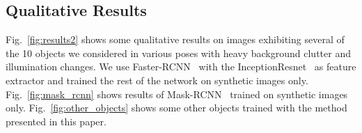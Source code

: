 \documentclass[10pt,twocolumn,letterpaper]{article}
\newcommand{\comment}[1]{}
\begin{document}

\subsection{Qualitative Results}
\label{sec:images}

Fig.~\ref{fig:results2}  shows some  qualitative  results  on images  exhibiting
several of the  10 objects we considered in various  poses with heavy background
clutter         and         illumination        changes.          We         use Faster-RCNN~\cite{faster_rcnn} with the
InceptionResnet~\cite{inception_resnet}  as feature  extractor  and trained  the
rest of  the network on  synthetic images only.   Fig.~\ref{fig:mask_rcnn} shows
results    of     Mask-RCNN~\cite{mask_rcnn}    trained         on     synthetic
images only.
Fig.~\ref{fig:other_objects} shows  some other  objects trained with  the method
presented in this paper.





\end{document}
